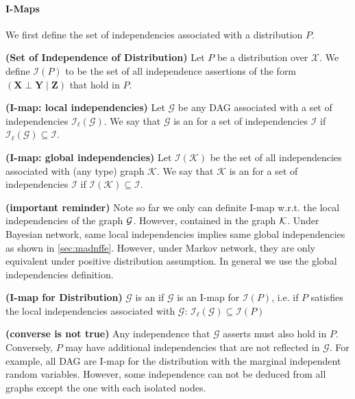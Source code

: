 \documentclass{article}
\newcommand{\bfs}[1]{\textbf{({#1}) }}
\begin{document}
\paragraph{I-Maps}
We first define the set of independencies associated with a distribution $P$.
\begin{defa}\bfs{Set of Independence of Distribution}\label{def:fasdfer}
Let $P$ be a distribution over $\mathcal{X}$. We define $\mathcal{I}(P)$ to be the set of all independence assertions of the form $(\boldsymbol{X} \perp \boldsymbol{Y} \mid \boldsymbol{Z})$ that hold in $P$. 
\end{defa}
\begin{defa}\bfs{I-map: local independencies}
Let $\mathcal{G}$ be any DAG  associated with a set of independencies $\mathcal{I}_{\ell}(\mathcal{G}) .$ We say that $\mathcal{G}$ is an  for a set of independencies $\mathcal{I}$ if $\mathcal{I}_{\ell}(\mathcal{G}) \subseteq \mathcal{I}$.%
\end{defa}
\begin{defa}\bfs{I-map: global independencies}\label{def:Imapglobal}
Let $\mathcal{I}(\mathcal{K})$ be the set of all independencies associated with (any type) graph $\mathcal{K}$. We say that $\mathcal{K}$ is an  for a set of independencies $\mathcal{I}$ if $\mathcal{I}(\mathcal{K}) \subseteq \mathcal{I}$.%
\end{defa}
\begin{rema}\bfs{important reminder}
 Note so far we only can definite I-map w.r.t. the local independencies of the graph $\mathcal{G}$. However,  contained in the graph $\mathcal{K}$. Under Bayesian network, same local independencies implies  same global independencies as shown in \cref{sec:madnffe}. However, under Markov network, they are only equivalent under positive distribution assumption. In general we use the global independencies definition.
\end{rema}
\begin{defa}\bfs{I-map for Distribution}
$\mathcal{G}$ is an  if $\mathcal{G}$ is an I-map for $\mathcal{I}(P)$, i.e. if $P$ satisfies the local independencies associated with $\mathcal{G}$: $\mathcal{I}_{\ell}(\mathcal{G}) \subseteq \mathcal{I}(P)$
\end{defa}
\begin{rema}\bfs{converse is not true}\label{re:fgrer}
Any independence that $\mathcal{G}$ asserts must also hold in $P$. Conversely, $P$ may have additional independencies that are not reflected in $\mathcal{G}$. For example, all DAG are I-map for the distribution with the marginal independent  random variables. However, some independence can not be deduced from all graphs except the one with each isolated nodes.
\end{rema}
\end{document}
